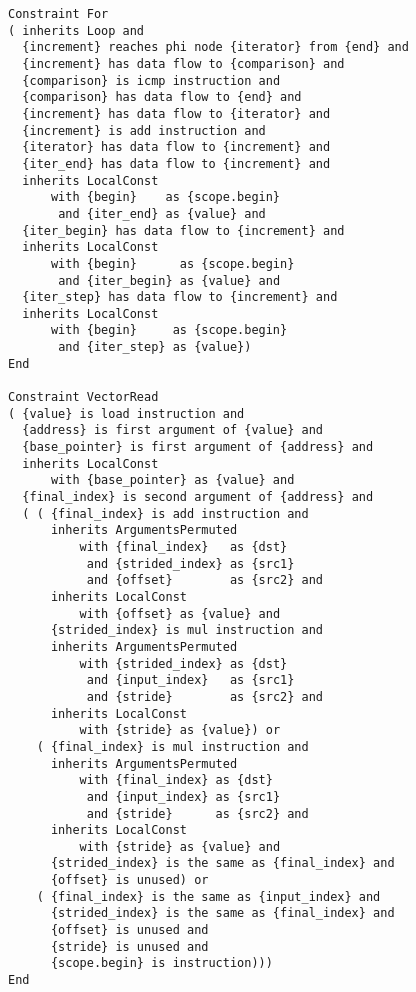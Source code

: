 \begin{figure}[p]
\begin{lstlisting}[language=IDL,basicstyle=\linespread{0.8}\small\ttfamily,
                   firstnumber=106]
Constraint For
( inherits Loop and
  {increment} reaches phi node {iterator} from {end} and
  {increment} has data flow to {comparison} and
  {comparison} is icmp instruction and
  {comparison} has data flow to {end} and
  {increment} has data flow to {iterator} and
  {increment} is add instruction and
  {iterator} has data flow to {increment} and
  {iter_end} has data flow to {increment} and
  inherits LocalConst
      with {begin}    as {scope.begin}
       and {iter_end} as {value} and
  {iter_begin} has data flow to {increment} and
  inherits LocalConst
      with {begin}      as {scope.begin}
       and {iter_begin} as {value} and
  {iter_step} has data flow to {increment} and
  inherits LocalConst
      with {begin}     as {scope.begin}
       and {iter_step} as {value})
End

Constraint VectorRead
( {value} is load instruction and
  {address} is first argument of {value} and
  {base_pointer} is first argument of {address} and
  inherits LocalConst
      with {base_pointer} as {value} and
  {final_index} is second argument of {address} and
  ( ( {final_index} is add instruction and
      inherits ArgumentsPermuted
          with {final_index}   as {dst}
           and {strided_index} as {src1}
           and {offset}        as {src2} and
      inherits LocalConst
          with {offset} as {value} and
      {strided_index} is mul instruction and
      inherits ArgumentsPermuted
          with {strided_index} as {dst}
           and {input_index}   as {src1}
           and {stride}        as {src2} and
      inherits LocalConst
          with {stride} as {value}) or 
    ( {final_index} is mul instruction and
      inherits ArgumentsPermuted
          with {final_index} as {dst}
           and {input_index} as {src1}
           and {stride}      as {src2} and
      inherits LocalConst
          with {stride} as {value} and
      {strided_index} is the same as {final_index} and
      {offset} is unused) or 
    ( {final_index} is the same as {input_index} and
      {strided_index} is the same as {final_index} and
      {offset} is unused and
      {stride} is unused and
      {scope.begin} is instruction)))
End
\end{lstlisting}
\end{figure}
